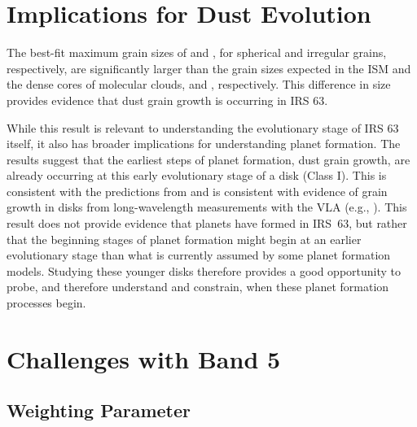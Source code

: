  
\section{Implications for Dust Evolution}
The best-fit maximum grain sizes of \sbest and \ibestNS, for spherical and irregular grains, respectively, are significantly larger than the grain sizes expected in the ISM and the dense cores of molecular clouds, \ism and \dccNS, respectively. This difference in size provides evidence that dust grain growth is occurring in IRS 63. 

While this result is relevant to understanding the evolutionary stage of IRS 63 itself, it also has broader implications for understanding planet formation. The results suggest that the earliest steps of planet formation, dust grain growth, are already occurring at this early evolutionary stage of a disk (Class I). This is consistent with the predictions from \cite{Dom2020} and is consistent with evidence of grain growth in disks from long-wavelength measurements with the VLA (e.g., \cite{Dom2018}). This result does not provide evidence that planets have formed in IRS~63, but rather that the beginning stages of planet formation might begin at an earlier evolutionary stage than what is currently assumed by some planet formation models. Studying these younger disks therefore provides a good opportunity to probe, and therefore understand and constrain, when these planet formation processes begin.

















\section{Challenges with Band 5}
\label{sec: discussion_band5_data_issues}
\subsection{Weighting Parameter}

